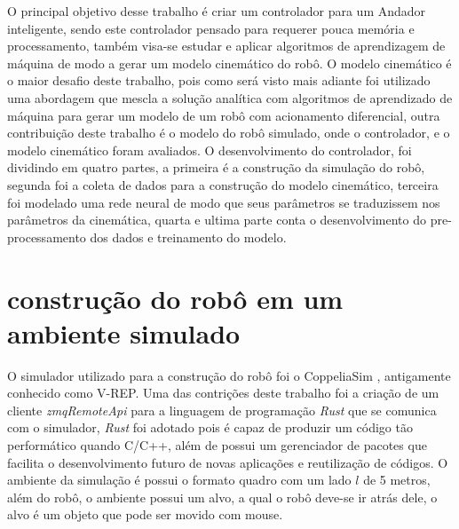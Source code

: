 
\label{Cap:Desenvolvimento}

O principal objetivo desse trabalho é criar um controlador para
um Andador inteligente, sendo este controlador pensado para requerer
pouca memória e processamento, também visa-se estudar e aplicar algoritmos
de aprendizagem de máquina de modo a gerar um modelo cinemático do robô.
O modelo cinemático é o maior desafio deste trabalho, pois como será visto
mais adiante foi utilizado uma abordagem que mescla a solução analítica com
algoritmos de aprendizado de máquina para gerar um modelo de um robô com
acionamento diferencial, outra contribuição deste trabalho é o modelo do
robô simulado, onde o controlador, e o modelo cinemático foram avaliados.
O desenvolvimento do controlador, foi dividindo em quatro partes, a primeira
é a construção da simulação do robô, segunda foi a coleta de dados para
a construção do modelo cinemático, terceira foi  modelado
uma rede neural de modo que seus parâmetros se traduzissem nos parâmetros
da cinemática, quarta e ultima parte conta o desenvolvimento
do pre-processamento dos dados e treinamento do modelo. 


\section{construção do robô em um ambiente simulado}
O simulador utilizado para a construção do robô foi o CoppeliaSim
\cite{rooban2021coppeliasim}, antigamente conhecido como V-REP.
Uma das contrições deste trabalho foi a criação de um cliente 
\textit{zmqRemoteApi} para a linguagem de programação \textit{Rust}
que se comunica com o simulador, \textit{Rust} foi adotado pois
é capaz de produzir um código tão performático quando C/C++, além
de possui um gerenciador de pacotes que facilita o desenvolvimento
futuro de novas aplicações e reutilização de códigos. O ambiente
da simulação é possui o formato quadro com um lado $l$ de 5 metros,
além do robô, o ambiente possui um alvo, a qual o robô deve-se ir
atrás dele, o alvo é um objeto que pode ser movido com mouse. 

